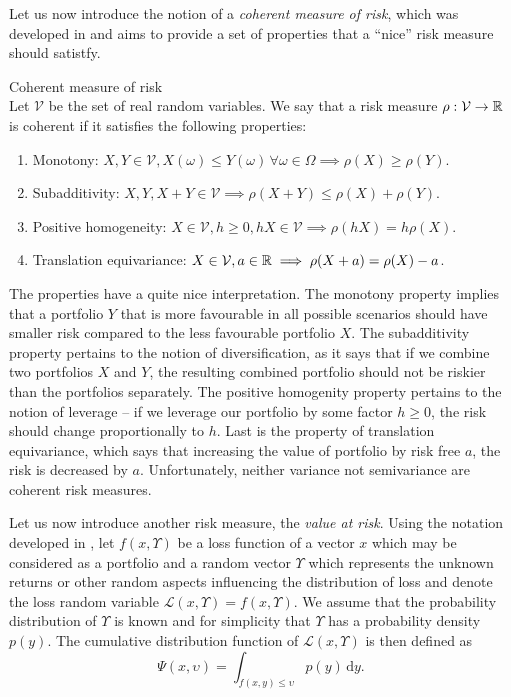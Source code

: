 Let us now introduce the notion of a \textit{coherent measure of risk}, which was developed in \cite[Defintion 2.4.]{coherent_measures_of_risk} and aims to provide a set of properties that a “nice” risk measure should satistfy.
\newpage
\begin{defn}{Coherent measure of risk} \\
Let $\mathcal{V}$ be the set of real random variables. We say that a risk measure $\rho: \mathcal{V} \rightarrow \mathbb{R}$ is coherent if it satisfies the following properties:
\begin{enumerate}
	\item Monotony: $X, Y \in \mathcal{V}, X(\omega) \leq Y(\omega) \, \forall \omega \in \Omega \implies \rho(X) \geq \rho(Y)$.
	\item Subadditivity: $X, Y, X+Y \in \mathcal{V} \implies \rho(X+	Y) \leq \rho(X) + \rho(Y)$.
	\item Positive homogeneity: $X \in \mathcal{V}, h \geq 0, hX \in \mathcal{V} \implies \rho(hX)=h\rho(X)$.
	\item Translation equivariance: $X \in \mathcal{V}, a \in \mathbb{R} \implies \rho(X+a)=\rho(X)-a$.
\end{enumerate}
\end{defn}
The properties have a quite nice interpretation. The monotony property implies that a portfolio $Y$ that is more favourable in all possible scenarios should have smaller risk compared to the less favourable portfolio $X$. The subadditivity property pertains to the notion of diversification, as it says that if we combine two portfolios $X$ and $Y$, the resulting combined portfolio should not be riskier than the portfolios separately. The positive homogenity property pertains to the notion of leverage -- if we leverage our portfolio by some factor $h\geq0$, the risk should change proportionally to $h$. Last is the property of translation equivariance, which says that increasing the value of portfolio by risk free $a$, the risk is decreased by $a$.  Unfortunately, neither variance not semivariance are coherent risk measures.

Let us now introduce another risk measure, the \textit{value at risk}.
Using the notation developed in \cite{cornuejols_tutuncu_2006}, let $f(x,\Upsilon)$ be a loss function of a vector $x$ which may be considered as a portfolio and a random vector $\Upsilon$ which represents the unknown returns or other random aspects influencing the distribution of loss and denote the loss random variable $\mathcal{L}(x,\Upsilon)=f(x,\Upsilon)$. We assume that the probability distribution of $\Upsilon$ is known and for simplicity that $\Upsilon$ has a probability density $p(y)$. The cumulative distribution function of $\mathcal{L}(x,\Upsilon)$ is then defined as
\begin{equation*}
\Psi(x,\upsilon)=\int_{f(x,y) \leq \upsilon} p(y) \, \mathrm{d}y.
\end{equation*}


